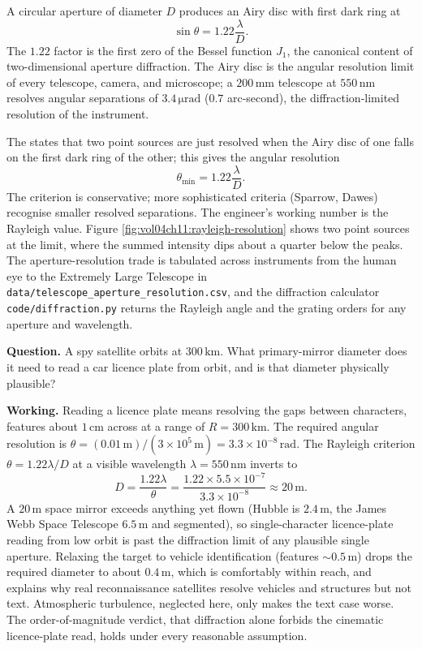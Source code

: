 

A
circular aperture of diameter $D$ produces an Airy disc with first
dark ring at
\[
\sin\theta = 1.22\frac{\lambda}{D}.
\]
The $1.22$ factor is the first zero of the Bessel function $J_{1}$,
the canonical content of two-dimensional aperture diffraction. The
Airy disc is the angular resolution limit of every telescope, camera,
and microscope; a $200\,\si{\milli\meter}$ telescope at $550\,\si{
\nano\meter}$ resolves angular separations of $3.4\,\si{\micro
\radian}$ ($0.7$ arc-second), the diffraction-limited resolution of
the instrument.

The  states that two point sources are
just resolved when the Airy disc of one falls on the first dark ring
of the other; this gives the angular resolution
\[
\theta_{\min} = 1.22\frac{\lambda}{D}.
\]
The criterion is conservative; more sophisticated criteria
(Sparrow, Dawes) recognise smaller resolved separations. The
engineer's working number is the Rayleigh value. Figure
\ref{fig:vol04ch11:rayleigh-resolution} shows two point sources at the
limit, where the summed intensity dips about a quarter below the peaks.
The aperture-resolution trade is tabulated across instruments from the
human eye to the Extremely Large Telescope in
\texttt{data/telescope\_aperture\_resolution.csv}, and the diffraction
calculator \texttt{code/diffraction.py} returns the Rayleigh angle and
the grating orders for any aperture and wavelength.



\begin{estimation}
\textbf{Question.} A spy satellite orbits at $300\,\si{\kilo\meter}$.
What primary-mirror diameter does it need to read a car licence plate
from orbit, and is that diameter physically plausible?

\textbf{Working.} Reading a licence plate means resolving the gaps
between characters, features about $1\,\si{\centi\meter}$ across at a
range of $R = 300\,\si{\kilo\meter}$. The required angular resolution is
$\theta = (0.01\,\si{\meter})/(3\times10^{5}\,\si{\meter}) = 3.3\times
10^{-8}\,\si{\radian}$. The Rayleigh criterion
$\theta = 1.22\lambda/D$ at a visible wavelength
$\lambda = 550\,\si{\nano\meter}$ inverts to
\[
D = \frac{1.22\lambda}{\theta} = \frac{1.22\times 5.5\times10^{-7}}
{3.3\times10^{-8}} \approx 20\,\si{\meter}.
\]
A $20\,\si{\meter}$ space mirror exceeds anything yet flown (Hubble is
$2.4\,\si{\meter}$, the James Webb Space Telescope $6.5\,\si{\meter}$
and segmented), so single-character licence-plate reading from low
orbit is past the diffraction limit of any plausible single aperture.
Relaxing the target to vehicle identification (features
$\sim 0.5\,\si{\meter}$) drops the required diameter to about
$0.4\,\si{\meter}$, which is comfortably within reach, and explains why
real reconnaissance satellites resolve vehicles and structures but not
text. Atmospheric turbulence, neglected here, only makes the text case
worse. The order-of-magnitude verdict, that diffraction alone forbids
the cinematic licence-plate read, holds under every reasonable
assumption.
\end{estimation}

